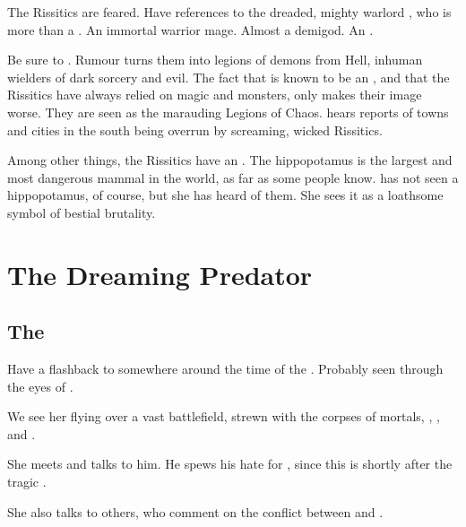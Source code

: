 The Rissitics are feared. 
Have references to the dreaded, mighty warlord \Narkiza, who is more than a \scatha. 
An immortal warrior mage. 
Almost a demigod. 
An . 

Be sure to . 
Rumour turns them into legions of demons from Hell, inhuman wielders of dark sorcery and evil.
The fact that \Narkiza is known to be an \Ashenoch, and that the Rissitics have always relied on magic and monsters, only makes their image worse.
They are seen as the marauding Legions of Chaos.
\Tiroco hears reports of towns and cities in the south being overrun by screaming, wicked Rissitics.


Among other things, the Rissitics have an . 
The hippopotamus is the largest and most dangerous mammal in the world, as far as some people know.
\Tiroco has not seen a hippopotamus, of course, but she has heard of them.
She sees it as a loathsome symbol of bestial brutality. 
















\section{The Dreaming Predator}
\subsection{The \SecondShrouding}
Have a flashback to somewhere around the time of the . 
Probably seen through the eyes of \Nzessuacrith. 

We see her flying over a vast battlefield, strewn with the corpses of mortals, \dragons{}, \cuezcans, \banes{} and \resphain. 

She meets \Secherdamon{} and talks to him. 
He spews his hate for \Ishnaruchaefir{}, since this is shortly after the tragic . 

She also talks to others, who comment on the conflict between \Ishnaruchaefir{} and \Secherdamon. 

